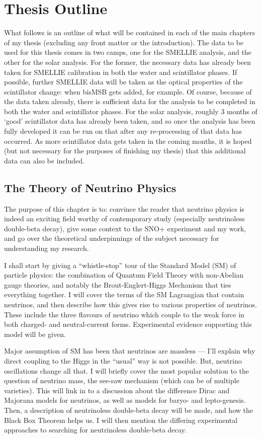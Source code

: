 \section{Thesis Outline}\label{sect:thesis_outline}
What follows is an outline of what will be contained in each of the main chapters of my thesis (excluding any front matter or the introduction). The data to be used for this thesis comes in two camps, one for the SMELLIE analysis, and the other for the solar analysis. For the former, the necessary data has already been taken for SMELLIE calibration in both the water and scintillator phases. If possible, further SMELLIE data will be taken as the optical properties of the scintillator change: when bisMSB gets added, for example. Of course, because of the data taken already, there is sufficient data for the analysis to be completed in both the water and scintillator phases. For the solar analysis, roughly 3 months of `good' scintillator data has already been taken, and so once the analysis has been fully developed it can be run on that after any re-processing of that data has occurred. As more scintillator data gets taken in the coming months, it is hoped (but not necessary for the purposes of finishing my thesis) that this additional data can also be included.
 
\subsection{The Theory of Neutrino Physics}
The purpose of this chapter is to: convince the reader that neutrino physics is indeed an exciting field worthy of contemporary study (especially neutrinoless double-beta decay), give some context to the SNO+ experiment and my work, and go over the theoretical underpinnings of the subject necessary for understanding my research.

I shall start by giving a ``whistle-stop'' tour of the Standard Model (SM) of particle physics: the combination of Quantum Field Theory with non-Abelian gauge theories, and notably the Brout-Englert-Higgs Mechanism that ties everything together. I will cover the terms of the SM Lagrangian that contain neutrinos, and then describe how this gives rise to various properties of neutrinos. These include the three flavours of neutrino which couple to the weak force in both charged- and neutral-current forms. Experimental evidence supporting this model will be given.

Major assumption of SM has been that neutrinos are massless --- I'll explain why direct coupling to the Higgs in the ``usual'' way is not possible. But, neutrino oscillations change all that. I will briefly cover the most popular solution to the question of neutrino mass, the see-saw mechanism (which can be of multiple varieties). This will link in to a discussion about the difference Dirac and Majorana models for neutrinos, as well as models for baryo- and lepto-genesis. Then, a description of neutrinoless double-beta decay will be made, and how the Black Box Theorem helps us. I will then mention the differing experimental approaches to searching for neutrinoless double-beta decay.

